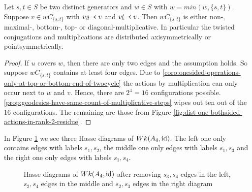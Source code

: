 \begin{prop}
	Let $s,t \in S$ be two distinct generators and $w \in S$ with $w = min(w,\{s,t\})$. Suppose $v \in wC_{\{s,t\}}$ with $v \underline{s} \prec v$ and $v \underline{t} \prec v$. Then $wC_{\{s,t\}}$ is either non-, maximal-, bottom-, top- or diagonal-multiplicative. In particular the twisted conjugations and multiplications are distributed axisymmetrically or pointsymmetrically.

	\begin{proof}
		If $u$ covers $w$, then there are only two edges and the assumption holds. So suppose $wC_{\{s,t\}}$ contains at least four edges. Due to \ref{coro:onesided-operations-only-at-top-or-bottom-end-of-twocycle} the actions by multiplication can only occur next to $w$ and $v$. Hence, there are $2^4 = 16$ configurations possible. \ref{prop:geodesics-have-same-count-of-multiplicative-steps} wipes out ten out of the 16 configurations. The remaining are those from Figure \ref{fig:dist-one-bothsided-actions-in-rank-2-residue}.
	\end{proof}
\end{prop}

\begin{exam}
	In Figure \ref{fig:a4_s1s3-and-a4_s2s4} we see three Hasse diagrams of $Wk(A_4, \operatorname{id})$. The left one only contains edges with labels $s_1,s_2$, the middle one only edges with labels $s_1,s_3$ and the right one only edges with labels $s_1,s_4$.
	\begin{figure}[ht]
		\centering
		
		\quad \quad
		
		\quad \quad
		
		\caption{Hasse diagrams of $Wk(A_4, \operatorname{id})$ after removing $s_3,s_4$ edges in the left, $s_2,s_4$ edges in the middle and $s_2,s_3$ edges in the right diagram}
		\label{fig:a4_s1s3-and-a4_s2s4}
	\end{figure}
\end{exam}

